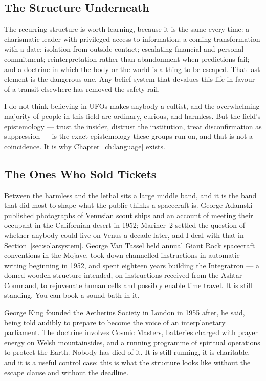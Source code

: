 \subsection{The Structure Underneath}\label{sec:cultstructure}

The recurring structure is worth learning, because it is the same every time: a charismatic
leader with privileged access to information; a coming transformation with a date; isolation from
outside contact; escalating financial and personal commitment; reinterpretation rather than
abandonment when predictions fail; and a doctrine in which the body or the world is a thing to
be escaped. That last element is the dangerous one. Any belief system that devalues this life
in favour of a transit elsewhere has removed the safety rail.

I do not think believing in UFOs makes anybody a cultist, and the overwhelming majority of
people in this field are ordinary, curious, and harmless. But the field's epistemology --- trust
the insider, distrust the institution, treat disconfirmation as suppression --- is the exact
epistemology these groups run on, and that is not a coincidence. It is why Chapter~\ref{ch:language} exists.

\subsection{The Ones Who Sold Tickets}\label{sec:cultcontactees}

Between the harmless and the lethal sits a large middle band, and it is the band that did most to
shape what the public thinks a spacecraft is. George Adamski published photographs of Venusian
scout ships and an account of meeting their occupant in the Californian desert in 1952; Mariner~2
settled the question of whether anybody could live on Venus a decade later, and I deal with that
in Section~\ref{sec:solarsystem}. George Van Tassel held annual Giant Rock spacecraft conventions in the
Mojave, took down channelled instructions in automatic writing beginning in 1952, and spent
eighteen years building the Integratron --- a domed wooden structure intended, on instructions
received from the Ashtar Command, to rejuvenate human cells and possibly enable time travel. It
is still standing. You can book a sound bath in it.

George King founded the Aetherius Society in London in 1955 after, he said, being told
audibly to prepare to become the voice of an interplanetary parliament. The doctrine involves
Cosmic Masters, batteries charged with prayer energy on Welsh mountainsides, and a running
programme of spiritual operations to protect the Earth. Nobody has died of it. It is still
running, it is charitable, and it is a useful control case: this is what the structure looks
like without the escape clause and without the deadline.

